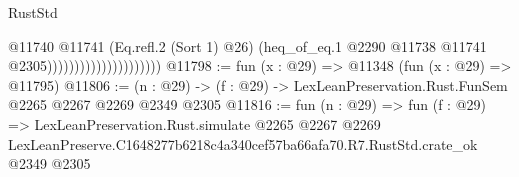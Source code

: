 \begin{lexlean}{RustStd}
\begin{coremodule}
                                          @11740
                                            @11741
                                            (Eq.refl.{2} (Sort 1) @26)
                                            (heq_of_eq.{1}
                                              @2290
                                              @11738
                                              @11741
                                              @2305)))))))))))))))))))))
@11798 := fun (x : @29) => @11348 (fun (x : @29) => @11795)
@11806 := (n : @29) -> (f : @29) -> LexLeanPreservation.Rust.FunSem @2265 @2267 @2269 @2349 @2305
@11816 := fun (n : @29) =>
  fun (f : @29) =>
  LexLeanPreservation.Rust.simulate
    @2265
    @2267
    @2269
    LexLeanPreserve.C1648277b6218c4a340cef57ba66afa70.R7.RustStd.crate_ok
    @2349
    @2305
\end{coremodule}
\end{lexlean}

